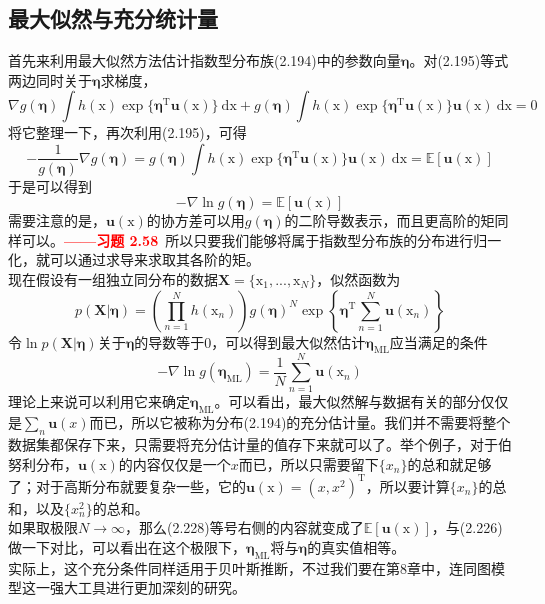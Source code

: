 \documentclass[b5paper]{book}
\numberwithin{equation}{chapter}
\newcommand {\bx} {\boldsymbol{\mathrm{x}}}
\newcommand {\rmT} {\mathrm{T}}
\newcommand {\bfeta} {\boldsymbol{\eta}}
\begin{document}
	\subsection{最大似然与充分统计量}
	\textnormal{
	首先来利用最大似然方法估计指数型分布族(2.194)中的参数向量$\bfeta$。对(2.195)等式两边同时关于$\bfeta$求梯度，
	\begin{equation}
		\nabla g(\bfeta) \int h(\bx)\exp\{\bfeta^{\rmT}\mathbf{u}(\bx)\}\ \mathrm{d}\bx + g(\bfeta)\int h(\bx)\exp\{\bfeta^{\rmT}\mathbf{u}(\bx)\}\mathbf{u}(\bx)\ \mathrm{d}\bx =0
	\end{equation}
	将它整理一下，再次利用(2.195)，可得
	\begin{equation}
		-\frac{1}{g(\bfeta)}\nabla g(\bfeta) = g(\bfeta)\int h(\bx)\exp\{\bfeta^{\rmT}\mathbf{u}(\bx)\} \mathbf{u}(\bx) \ \mathrm{d}\bx = \mathbb{E}[\mathbf{u}(\bx)]
	\end{equation}
	于是可以得到
	\begin{equation}
		-\nabla \ln g(\bfeta) = \mathbb{E}[\mathbf{u}(\bx)]
	\end{equation}
	需要注意的是，$\mathbf{u}(\bx)$的协方差可以用$g(\bfeta)$的二阶导数表示，而且更高阶的矩同样可以。\textcolor{red}{\textbf{——习题 2.58}}\ 所以只要我们能够将属于指数型分布族的分布进行归一化，就可以通过求导来求取其各阶的矩。\\
	\indent 现在假设有一组独立同分布的数据$\mathbf{X}=\{\bx_1,...,\bx_N\}$，似然函数为
	\begin{equation}
		p(\mathbf{X}|\bfeta)=\left(\prod_{n=1}^N h(\bx_n)\right)g(\bfeta)^N \exp \left\{\bfeta^{\rmT}\sum_{n=1}^N \mathbf{u}(\bx_n)\right\}
	\end{equation}
	令$\ln p(\mathbf{X|\bfeta})$关于$\bfeta$的导数等于0，可以得到最大似然估计$\bfeta_{\mathrm{ML}}$应当满足的条件
	\begin{equation}
		-\nabla \ln g(\bfeta_{\mathrm{ML}})=\frac{1}{N}\sum_{n=1}^N\mathbf{u}(\bx_n)
	\end{equation}
	理论上来说可以利用它来确定$\bfeta_{\mathrm{ML}}$。可以看出，最大似然解与数据有关的部分仅仅是$\sum_n\mathbf{u}(x)$而已，所以它被称为分布(2.194)的充分估计量。我们并不需要将整个数据集都保存下来，只需要将充分估计量的值存下来就可以了。举个例子，对于伯努利分布，$\mathbf{u}(\bx)$的内容仅仅是一个$x$而已，所以只需要留下$\{x_n\}$的总和就足够了；对于高斯分布就要复杂一些，它的$\mathbf{u}(\bx)=(x,x^2)^{\rmT}$，所以要计算$\{x_n\}$的总和，以及$\{x_n^2\}$的总和。\\
	\indent 如果取极限$N \rightarrow \infty$，那么(2.228)等号右侧的内容就变成了$\mathbb{E}[\mathbf{u}(\bx)]$，与(2.226)做一下对比，可以看出在这个极限下，$\bfeta_{\mathrm{ML}}$将与$\bfeta$的真实值相等。\\
	\indent 实际上，这个充分条件同样适用于贝叶斯推断，不过我们要在第8章中，连同图模型这一强大工具进行更加深刻的研究。
	}
\end{document}
